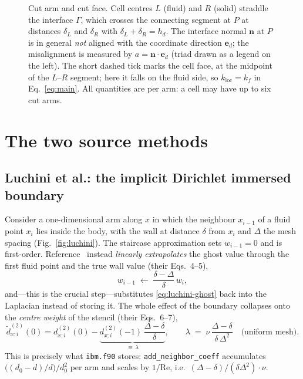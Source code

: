 \documentclass[11pt,a4paper]{article}
\newcommand{\ed}{\boldsymbol{e}_d}
\newcommand{\nn}{\boldsymbol{n}}
\newcommand{\code}[1]{\texttt{#1}}
\begin{document}
\begin{figure}[htbp]
\caption{Cut arm and cut face. Cell centres $L$ (fluid) and $R$ (solid) straddle
the interface $\Gamma$, which crosses the connecting segment at $P$ at distances
$\delta_L$ and $\delta_R$ with $\delta_L+\delta_R=h_d$. The interface normal
$\nn$ at $P$ is in general \emph{not} aligned with the coordinate direction
$\ed$; the misalignment is measured by $a=\nn\cdot\ed$ (triad drawn as a legend
on the left). The short dashed tick marks the cell face, at the midpoint of the
$L$--$R$ segment; here it falls on the fluid side, so $k_{\text{loc}}=k_f$ in
Eq.~\eqref{eq:main}. All quantities are per arm: a cell may have up to six cut
arms.}
\label{fig:geometry}
\end{figure}

\section{The two source methods}

\subsection{Luchini et al.: the implicit Dirichlet immersed boundary}
\label{sec:luchini}

Consider a one-dimensional arm along $x$ in which the neighbour $x_{i-1}$ of a
fluid point $x_i$ lies inside the body, with the wall at distance $\delta$ from
$x_i$ and $\Delta$ the mesh spacing (Fig.~\ref{fig:luchini}). The staircase
approximation sets $w_{i-1}=0$ and is first-order. Reference~\cite{luchini2025}
instead \emph{linearly extrapolates} the ghost value through the first fluid
point and the true wall value (their Eqs.~4--5),
\begin{equation}
  w_{i-1} \;\longleftarrow\; \frac{\delta-\Delta}{\delta}\,w_i ,
  \label{eq:luchini-ghost}
\end{equation}
and---this is the crucial step---substitutes \eqref{eq:luchini-ghost} back into
the Laplacian instead of storing it. The whole effect of the boundary collapses
onto the \emph{centre weight} of the stencil (their Eqs.~6--7),
\begin{equation}
  \tilde d^{(2)}_{x;i}(0) = d^{(2)}_{x;i}(0) - \underbrace{d^{(2)}_{x;i}(-1)\,
    \frac{\Delta-\delta}{\delta}}_{\textstyle \equiv\,\lambda},
  \qquad
  \lambda \;=\; \nu\,\frac{\Delta-\delta}{\delta\,\Delta^{2}}
  \quad\text{(uniform mesh)} .
  \label{eq:lambda}
\end{equation}
This is precisely what \code{ibm.f90} stores: \code{add\_neighbor\_coeff}
accumulates $\big((d_0-d)/d\big)/d_0^{2}$ per arm and scales by $1/\mathrm{Re}$,
i.e.\ $(\Delta-\delta)/(\delta\Delta^2)\cdot\nu$.
\end{document}
